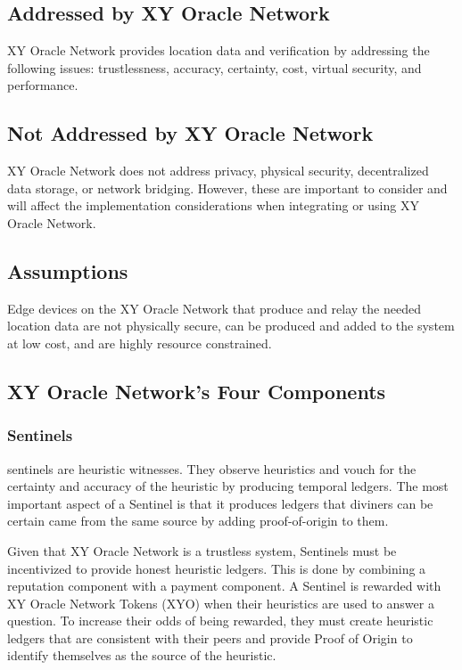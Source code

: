 \documentclass{article}
\begin{document}
\subsection {Addressed by XY Oracle Network}
XY Oracle Network provides location data and verification by addressing the following issues: trustlessness, accuracy, \gls{certainty}, cost, virtual security, and performance.

\subsection {Not Addressed by XY Oracle Network}
XY Oracle Network does not address privacy, physical security, decentralized data storage, or network bridging. However, these are important to consider and will affect the implementation considerations when integrating or using XY Oracle Network.

\subsection {Assumptions}
Edge devices on the XY Oracle Network that produce and relay the needed location data are not physically secure, can be produced and added to the system at low cost, and are highly resource constrained.

\subsection {XY Oracle Network's Four Components}

\subsubsection {Sentinels}
\Glspl{sentinel} are \gls{heuristic} witnesses. They observe heuristics and vouch for the \gls{certainty} and \gls{accuracy} of the heuristic by producing temporal ledgers. The most important aspect of a Sentinel is that it produces ledgers that \Glspl{diviner} can be certain came from the same source by adding \Gls{proof-of-origin} to them.

Given that XY Oracle Network is a trustless system, Sentinels must be incentivized to provide honest heuristic ledgers. This is done by combining a reputation component with a payment component. A Sentinel is rewarded with XY Oracle Network Tokens (XYO) when their heuristics are used to answer a question. To increase their odds of being rewarded, they must create heuristic ledgers that are consistent with their peers and provide Proof of Origin to identify themselves as the source of the heuristic.
\end{document}
